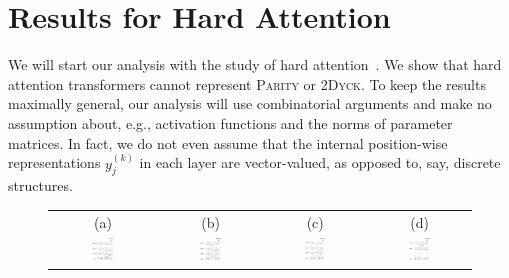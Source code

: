 \documentclass[11pt,a4paper]{article}
\begin{document}
\section{Results for Hard Attention}\label{sec:hard}

We will start our analysis with the study of hard attention~\cite{perez2019turing}.
We show that hard attention transformers cannot represent \textsc{Parity} or \textsc{2Dyck}. 
To keep the results maximally general, our analysis will use combinatorial arguments and make no assumption about, e.g., activation functions and the norms of parameter matrices.
In fact, we do not even assume that the internal position-wise representations $y_{j}^{(k)}$ in each layer are vector-valued, as opposed to, say, discrete structures.




\begin{figure}[ht]
    \centering
    \begin{tabular}{cccc}
    (a) & (b) & (c) & (d) \\
    \includegraphics[width=0.23\textwidth]{figures/sa1_.png} &
        \includegraphics[width=0.23\textwidth]{figures/sa2_b.png}&
    \includegraphics[width=0.22\textwidth]{figures/sa3_b.png} &
        \includegraphics[width=0.23\textwidth]{figures/sa4_b.png}

\end{tabular}
\end{figure}
\end{document}
